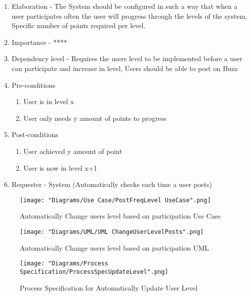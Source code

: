 \documentclass[12pt]{article}
\begin{document}
\begin{enumerate}
\begin{enumerate}
    \item Elaboration - The System should be configured in such a way that when a user participates often the user will progress through the levels of the system, Specific number of points required per level.
    \item Importance - ****
    \item Dependency level - Requires the users level to be implemented before a user can participate and increase in level, Users should be able to post on Buzz
    \item Pre-conditions
    \begin{enumerate}
    	\item User is in level x
    	\item User only needs y amount of points to progress
    \end{enumerate}
        \item Post-conditions
    \begin{enumerate}
    	\item User achieved y amount of point
    	\item User is now in level x+1
    \end{enumerate}
    \item Requester - System (Automatically checks each time a user posts)
  \end{enumerate}
\begin{figure}[h]
	\centering
	\texttt{[image: "Diagrams/Use Case/PostFreqLevel UseCase".png]}
	\caption{Automatically Change users level based on participation Use Case}
\end{figure}
\begin{figure}[h]
	\centering
	\texttt{[image: "Diagrams/UML/UML ChangeUserLevelPosts".png]}
	\caption{Automatically Change users level based on participation UML}
\end{figure}
\begin{figure}[h]
	\centering
	\texttt{[image: "Diagrams/Process Specification/ProcessSpecUpdateLevel".png]}
	\caption{Process Specification for Automatically Update User Level}
\end{figure} \clearpage %


\end{enumerate}
\end{document}
